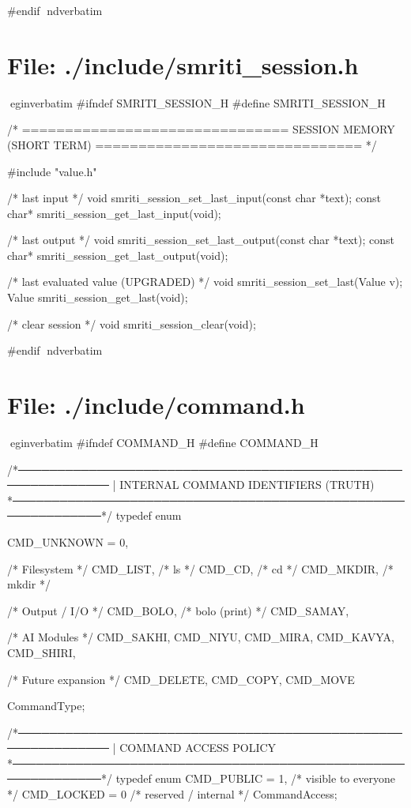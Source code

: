 \documentclass{article}
\begin{document}
#endif
nd{verbatim}
\section*{File: ./include/smriti_session.h}
egin{verbatim}
#ifndef SMRITI_SESSION_H
#define SMRITI_SESSION_H

/* ===============================
   SESSION MEMORY (SHORT TERM)
   =============================== */

#include "value.h"

/* last input */
void smriti_session_set_last_input(const char *text);
const char* smriti_session_get_last_input(void);

/* last output */
void smriti_session_set_last_output(const char *text);
const char* smriti_session_get_last_output(void);

/* last evaluated value (UPGRADED) */
void smriti_session_set_last(Value v);
Value smriti_session_get_last(void);

/* clear session */
void smriti_session_clear(void);

#endif
nd{verbatim}
\section*{File: ./include/command.h}
egin{verbatim}
#ifndef COMMAND_H
#define COMMAND_H

/*──────────────────────────────────────────────────────────────
 | INTERNAL COMMAND IDENTIFIERS (TRUTH)
 *──────────────────────────────────────────────────────────────*/
typedef enum {

    CMD_UNKNOWN = 0,

    /* Filesystem */
    CMD_LIST,        /* ls */
    CMD_CD,          /* cd */
    CMD_MKDIR,       /* mkdir */

    /* Output / I/O */
    CMD_BOLO,        /* bolo (print) */
    CMD_SAMAY,

/* AI Modules */
    CMD_SAKHI,
    CMD_NIYU,
    CMD_MIRA,
    CMD_KAVYA,
    CMD_SHIRI,

    /* Future expansion */
    CMD_DELETE,
    CMD_COPY,
    CMD_MOVE



} CommandType;


/*──────────────────────────────────────────────────────────────
 | COMMAND ACCESS POLICY
 *──────────────────────────────────────────────────────────────*/
typedef enum {
    CMD_PUBLIC = 1,     /* visible to everyone */
    CMD_LOCKED = 0      /* reserved / internal */
} CommandAccess;
\end{document}
